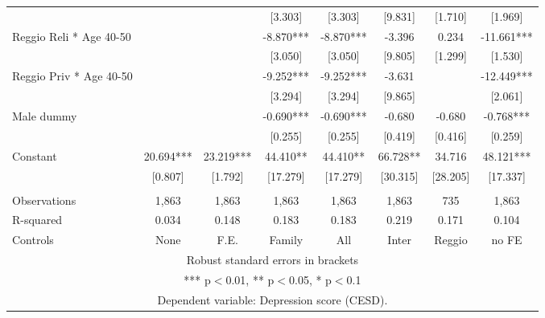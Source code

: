 \begin{tabular}{lccccccc}
 &  &  & [3.303] & [3.303] & [9.831] & [1.710] & [1.969] \\
Reggio Reli * Age 40-50 &  &  & -8.870*** & -8.870*** & -3.396 & 0.234 & -11.661*** \\
 &  &  & [3.050] & [3.050] & [9.805] & [1.299] & [1.530] \\
Reggio Priv * Age 40-50 &  &  & -9.252*** & -9.252*** & -3.631 &  & -12.449*** \\
 &  &  & [3.294] & [3.294] & [9.865] &  & [2.061] \\
Male dummy &  &  & -0.690*** & -0.690*** & -0.680 & -0.680 & -0.768*** \\
 &  &  & [0.255] & [0.255] & [0.419] & [0.416] & [0.259] \\
Constant & 20.694*** & 23.219*** & 44.410** & 44.410** & 66.728** & 34.716 & 48.121*** \\
 & [0.807] & [1.792] & [17.279] & [17.279] & [30.315] & [28.205] & [17.337] \\
 &  &  &  &  &  &  &  \\
Observations & 1,863 & 1,863 & 1,863 & 1,863 & 1,863 & 735 & 1,863 \\
R-squared & 0.034 & 0.148 & 0.183 & 0.183 & 0.219 & 0.171 & 0.104 \\
 Controls & None & F.E. & Family & All & Inter & Reggio & no FE \\ \hline
\multicolumn{8}{c}{ Robust standard errors in brackets} \\
\multicolumn{8}{c}{ *** p$<$0.01, ** p$<$0.05, * p$<$0.1} \\
\multicolumn{8}{c}{ Dependent variable: Depression score (CESD).} \\
\end{tabular}
